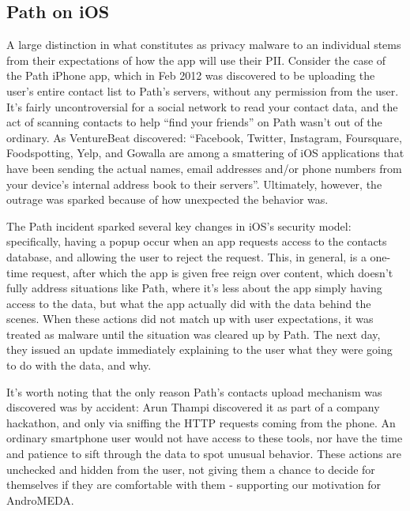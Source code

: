 \subsection{Path on iOS}
\label{sec:path}
A large distinction in what constitutes as privacy malware to an individual stems from their expectations of how the app will use their PII. Consider the case of the Path iPhone app, which in Feb 2012 was discovered to be uploading the user's entire contact list to Path's servers, without any permission from the user\citep{thampi2012}. It's fairly uncontroversial for a social network to read your contact data, and the act of scanning contacts to help ``find your friends'' on Path wasn't out of the ordinary. As VentureBeat discovered: ``Facebook, Twitter, Instagram, Foursquare, Foodspotting, Yelp, and Gowalla are among a smattering of iOS applications that have been sending the actual names, email addresses and/or phone numbers from your device's internal address book to their servers''\citep{vb2012addressbook}. Ultimately, however, the outrage was sparked because of how unexpected the behavior was.

The Path incident sparked several key changes in iOS's security model: specifically, having a popup occur when an app requests access to the contacts database, and allowing the user to reject the request. This, in general, is a one-time request, after which the app is given free reign over content\citep{AppleContacts}, which doesn't fully address situations like Path, where it's less about the app simply having access to the data, but what the app actually did with the data behind the scenes. When these actions did not match up with user expectations, it was treated as malware until the situation was cleared up by Path. The next day, they issued an update immediately explaining to the user what they were going to do with the data, and why.

It's worth noting that the only reason Path's contacts upload mechanism was discovered was by accident: Arun Thampi discovered it as part of a company hackathon, and only via sniffing the HTTP requests coming from the phone. An ordinary smartphone user would not have access to these tools, nor have the time and patience to sift through the data to spot unusual behavior. These actions are unchecked and hidden from the user, not giving them a chance to decide for themselves if they are comfortable with them - supporting our motivation for AndroMEDA.

